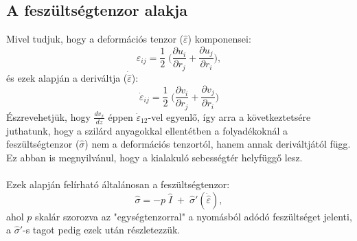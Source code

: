 \documentclass[a4paper, titlepage]{article}
\begin{document}
\subsection*{A feszültségtenzor alakja}
Mivel tudjuk, hogy a deformációs tenzor ($\hat{\varepsilon}$) komponensei:
$$\varepsilon_{ij}=\frac{1}{2}\;\bigg(\frac{\partial u_i}{\partial r_j}+\frac{\partial u_j}{\partial r_i}\bigg),$$
és ezek alapján a deriváltja ($\dot{\hat{\varepsilon}}$):
$$\dot{\varepsilon}_{ij}=\frac{1}{2}\;\bigg(\frac{\partial v_i}{\partial r_j}+\frac{\partial v_j}{\partial r_i}\bigg)$$
Észrevehetjük, hogy $\frac{dv_x}{dz}$ éppen $\dot{\varepsilon}_{12}$-vel egyenlő, így arra a következtetsére juthatunk, hogy a szilárd anyagokkal ellentétben a folyadékoknál a feszültségtenzor ($\hat{\sigma}$) nem a deformációs tenzortól, hanem annak deriváltjától függ. Ez abban is megnyilvánul, hogy a kialakuló sebességtér helyfüggő lesz.\\\\
Ezek alapján felírható általánosan a feszültségtenzor:
\begin{equation}
\label{equ:sigma}
\hat{\sigma}=-p\;\hat{I}\; +\; \hat{\sigma}'(\dot{\hat{\varepsilon}}),
\end{equation}
ahol $p$ skalár szorozva az "egységtenzorral" a nyomásból adódó feszültséget jelenti, a $\hat{\sigma}'$-s tagot pedig ezek után részletezzük.
\end{document}
